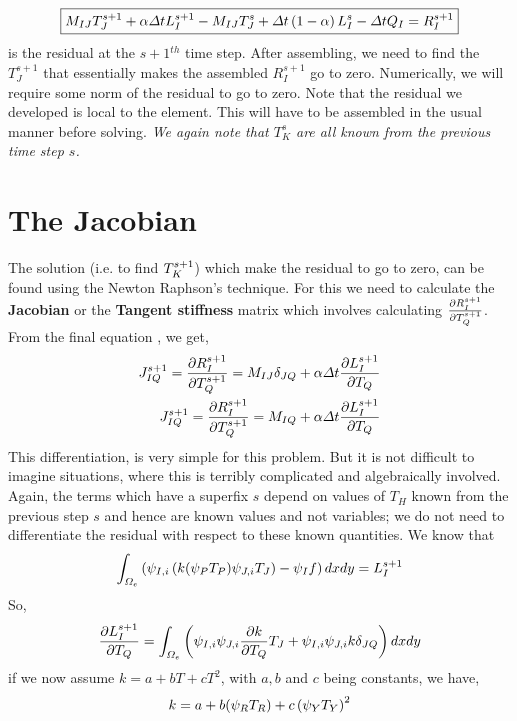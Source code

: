 \documentclass[preprint,12pt]{elsarticle}
\numberwithin{equation}{section}
\begin{document}
\begin{equation}
	\boxed{
	M_{IJ}T_{J}^{s+1} +	\alpha \Delta t L_I^{s+1}  - M_{IJ}T_{J}^s + \Delta t \left( 1-\alpha \right) L_I^s - \Delta t Q_I = R_I^{s+1}
}
 \label{eq:finaleq}
\end{equation}
is the residual at the $s+1$$^{th}$ time step. After assembling, we need to find the $T_{J}^{s+1}$ that essentially makes the assembled $R_I^{s+1}$ go to zero. Numerically, we will require some norm of the residual to go to zero. Note that the residual we developed is local to the element. This will have to be assembled in the usual manner before solving. \textit{We again note that $T_K^{s}$ are all known from the previous time step $s$. }

\section{The Jacobian}
The solution (i.e. to find $T_K^{s+1}$) which make the residual to go to zero, can be found using the Newton Raphson's technique. For this we need to calculate the \textbf{Jacobian} or the \textbf{Tangent stiffness} matrix  which involves calculating 
 $\frac{\partial R_I^{s+1}}{\partial T_{Q}^{s+1}}$. From the final equation , we get, 
\begin{eqnarray}
J_{IQ}^{s+1}=\frac{\partial R_I^{s+1}}{\partial T_{Q}^{s+1}} = M_{IJ}\delta_{JQ} + \alpha \Delta t \frac{\partial L_I^{s+1}}{\partial T_Q}\\
J_{IQ}^{s+1}=\frac{\partial R_I^{s+1}}{\partial T_{Q}^{s+1}} = M_{IQ} + \alpha \Delta t \frac{\partial L_I^{s+1}}{\partial T_Q} \label{jacob}
\end{eqnarray}
This differentiation, is very simple for this problem. But it is not difficult to imagine situations, where this is terribly complicated and algebraically involved. Again, the terms which have a superfix $s$ depend on values of $T_H$ known from the previous step $s$ and hence are known values and not variables; we do not need to differentiate the residual with respect to these known quantities. We know that 
\begin{equation}
	\int_{\Omega_e} \left( \psi_{I,i} \left( k (\psi_PT_P) \psi_{J,i}T_J \right) - \psi_I f \right)  dx dy = L_I^{s+1}
\end{equation}
So,
\begin{equation}
	\frac{\partial L_I^{s+1}}{\partial T_Q} = \int_{\Omega_e} \left( \psi_{I,i}\psi_{J,i}  \frac{\partial k}{\partial T_Q} T_J  + \psi_{I,i}\psi_{J,i} k \delta_{JQ} \right)  dx dy 
\end{equation}
if we now assume $k = a+bT+cT^2$, with $a,b$ and $c$ being constants, we have,
\begin{equation}
	k = a + b  (\psi_R T_R) + c \left( \psi_Y T_Y \right)^2
\end{equation}
\end{document}
